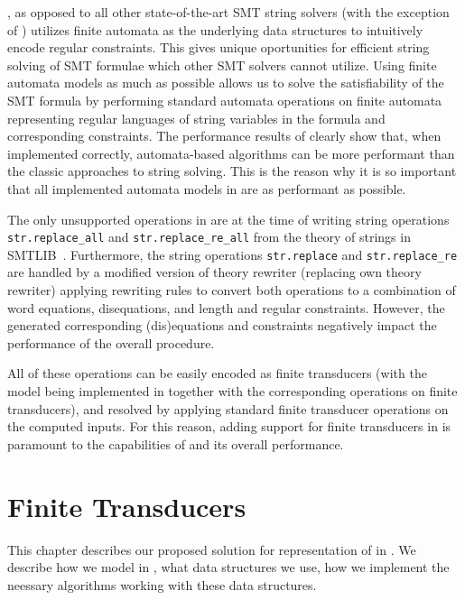 \noodler, as opposed to all other state-of-the-art SMT string solvers (with the exception of \ostrich) utilizes finite automata as the underlying data structures to intuitively encode regular constraints.
This gives \noodler unique oportunities for efficient string solving of SMT formulae which other SMT solvers cannot utilize.
Using finite automata models as much as possible allows us to solve the satisfiability of the SMT formula by performing standard automata operations on finite automata representing regular languages of string variables in the formula and corresponding constraints.
The performance results of \noodler clearly show that, when implemented correctly, automata-based algorithms can be more performant than the classic approaches to string solving.
This is the reason why it is so important that all implemented automata models in \mata are as performant as possible.

The only unsupported operations in \noodler are at the time of writing string operations \texttt{str.replace\_all} and \texttt{str.replace\_re\_all} from the theory of strings in SMTLIB~\cite{smtlib_theory_strings}.
Furthermore, the string operations \texttt{str.replace} and \texttt{str.replace\_re} are handled by a modified \noodler version of theory rewriter (replacing \ziii own theory rewriter) applying rewriting rules to convert both operations to a combination of word equations, disequations, and length and regular constraints.
However, the generated corresponding (dis)equations and constraints negatively impact the performance of the overall procedure.

All of these operations can be easily encoded as finite transducers (with the model being implemented in \mata together with the corresponding operations on finite transducers), and resolved by applying standard finite transducer operations on the computed inputs.
For this reason, adding support for finite transducers in \mata is paramount to the capabilities of \noodler and its overall performance.

\chapter{Finite Transducers}

This chapter describes our proposed solution for representation of \nfts in \mata. We describe how we model \nfts in \mata, what data structures we use, how we implement the neessary algorithms working with these data structures.

